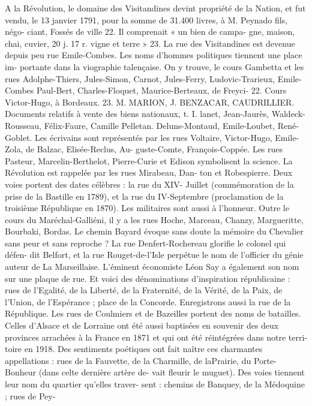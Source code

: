 \documentclass[a4paper,11pt]{book}
\begin{document}
A la Révolution, le domaine des Visitandines devint
propriété de la Nation, et fut vendu, le 13 janvier 1791,
pour la somme de 31.400 livres, à M. Peynado fils, négo-
ciant, Fossés de ville 22. Il comprenait « un bien de campa-
gne, maison, chai, cuvier, 20 j. 17 r. vigne et terre » 23.
La rue des Visitandines est devenue depuis peu rue
Emile-Combes.
Les noms d'hommes politiques tiennent une place im-
portante dans la viographie talençaise. On y trouve, le
cours Gambetta et les rues Adolphe-Thiers, Jules-Simon,
Carnot, Jules-Ferry, Ludovic-Trarieux, Emile-Combes
Paul-Bert, Charles-Floquet, Maurice-Berteaux, de Freyci-
22. Cours Victor-Hugo, à Bordeaux.
23. M. MARION, J. BENZACAR, CAUDRILLIER. Documents relatifs à
vente des biens nationaux, t. I.
lanet, Jean-Jaurès, Waldeck-Rousseau, Félix-Faure, Camille
Pelletan. Deluns-Montaud, Emile-Loubet, René-Goblet.
Les écrivains sont représentés par les rues Voltaire,
Victor-Hugo, Emile-Zola, de Balzac, Elisée-Reclus, Au-
guste-Comte, François-Coppée.
Les rues Pasteur, Marcelin-Berthelot, Pierre-Curie et
Edison symbolisent la science.
La Révolution est rappelée par les rues Mirabeau, Dan-
ton et Robespierre.
Deux voies portent des dates célèbres : la rue du XIV-
Juillet (commémoration de la prise de la Bastille en 1789),
et la rue du IV-Septembre (proclamation de la troisième
République en 1870).
Les militaires sont aussi à l'honneur. Outre le cours du
Maréchal-Galliéni, il y a les rues Hoche, Marceau, Chanzy,
Margueritte, Bourbaki, Bordas.
Le chemin Bayard évoque sans doute la mémoire du
Chevalier sans peur et sans reproche ?
La rue Denfert-Rochereau glorifie le colonel qui défen-
dit Belfort, et la rue Rouget-de-l'Isle perpétue le nom de
l'officier du génie auteur de La Marseillaise.
L'éminent économiste Léon Say a également son nom
sur une plaque de rue.
Et voici des dénominations d'inspiration républicaine :
rues de l'Egalité, de la Liberté, de la Fraternité, de la
Vérité, de la Paix, de l'Union, de l'Espérance ; place de la
Concorde. Enregistrons aussi la rue de la République.
Les rues de Coulmiers et de Bazeilles portent des noms
de batailles. Celles d'Alsace et de Lorraine ont été aussi
baptisées en souvenir des deux provinces arrachées à la
France en 1871 et qui ont été réintégrées dans notre terri-
toire en 1918.
Des sentiments poétiques ont fait naître ces charmantes
appellations : rues de la Fauvette, de la Charmille, de laPrairie, du Porte-Bonheur (dans celte dernière artère de-
vait fleurir le muguet).
Des voies tiennent leur nom du quartier qu'elles traver-
sent : chemins de Banquey, de la Médoquine ; rues de Pey-
\end{document}
